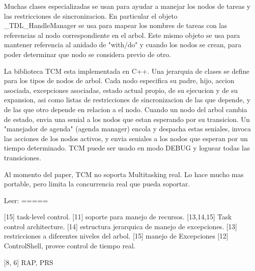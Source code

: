 Muchas clases especializadas se usan para ayudar a manejar los nodos
de tareas y las restricciones de sincronizacion. En particular
el objeto _TDL_HandleManager se usa para mapear los nombres de tareas con
las referencias al nodo correspondiente en el arbol.
Este mismo objeto se usa para mantener referencia al anidado de "with/do" y
cuando los nodos se crean, para poder determinar que nodo se
considera previo de otro.

La biblioteca TCM esta implementada en C++. Una jerarquia de clases se
define para los tipos de nodos de arbol.
Cada nodo especifica su padre, hijo, accion asociada, excepciones asociadas,
estado actual propio, de su ejecucion y de su expansion, asi como listas de
restricciones de sincronizacion de las que depende, y de las que otro 
depende en relacion a el nodo.
Cuando un nodo del arbol cambia de estado, envia una senial a los nodos
que estan esperando por su transicion.
Un "manejador de agenda" (agenda manager) encola y despacha estas seniales,
invoca las acciones de los nodos activos, y envia seniales a los nodos
que esperan por un tiempo determinado.
TCM puede ser usado en modo DEBUG y loguear todas las transiciones.

Al momento del paper, TCM no soporta Multitasking real. 
Lo hace mucho mas portable, pero limita la concurrencia real que pueda
soportar.


Leer:
=====

[15] task-level control.
[11] soporte para manejo de recursos.
[13,14,15] Task control architecture.
[14] estructura jerarquica de manejo de excepciones.
[13] restricciones a diferentes niveles del arbol.
[15] manejo de Excepciones
[12] ControlShell, provee control de tiempo real.


[8, 6] RAP, PRS
